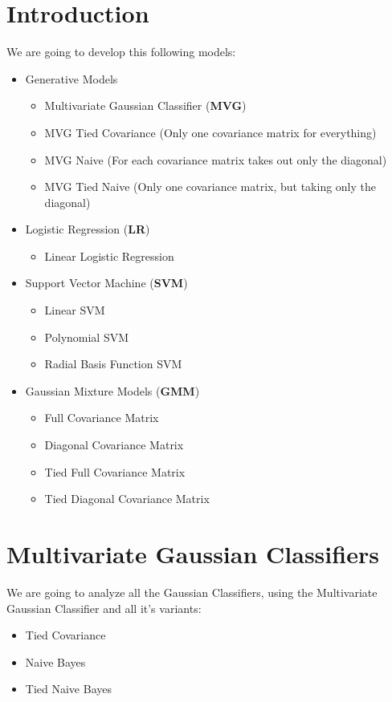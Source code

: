 \documentclass[english]{report}
\begin{document}
\section{Introduction}
We are going to develop this following models:
\begin{itemize}
    \item Generative Models
    \begin{itemize}
        \item Multivariate Gaussian Classifier (\textbf{MVG})
        \item MVG Tied Covariance (Only one covariance matrix for everything)
        \item MVG Naive (For each covariance matrix takes out only the diagonal)
        \item MVG Tied Naive (Only one covariance matrix, but taking only the diagonal)
    \end{itemize}
    \item Logistic Regression (\textbf{LR})
    \begin{itemize}
        \item Linear Logistic Regression
    \end{itemize}
    \item Support Vector Machine (\textbf{SVM})
    \begin{itemize}
        \item Linear SVM
        \item Polynomial SVM
        \item Radial Basis Function SVM
    \end{itemize}
    \item Gaussian Mixture Models (\textbf{GMM})
    \begin{itemize}
        \item Full Covariance Matrix
        \item Diagonal Covariance Matrix
        \item Tied Full Covariance Matrix
        \item Tied Diagonal Covariance Matrix
    \end{itemize}
\end{itemize}

\clearpage

\section{Multivariate Gaussian Classifiers}

We are going to analyze all the Gaussian Classifiers, using the Multivariate Gaussian Classifier and all it's variants: 
\begin{itemize}
    \item Tied Covariance
    \item Naive Bayes
    \item Tied Naive Bayes
\end{itemize}
\end{document}
